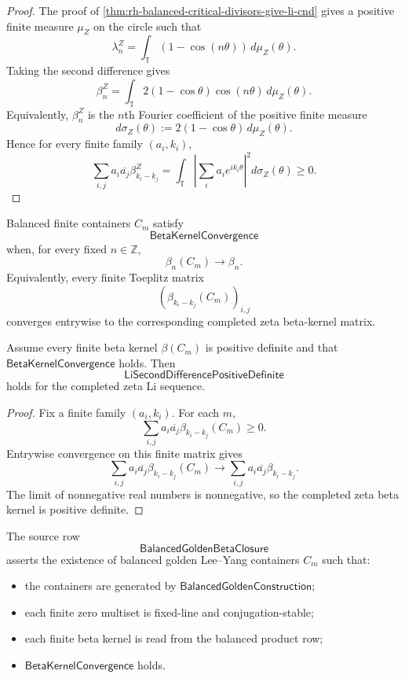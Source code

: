 \begin{proof}
The proof of
\autoref{thm:rh-balanced-critical-divisors-give-li-cnd} gives a
positive finite measure $\mu_Z$ on the circle such that
$$
\lambda_n^Z
=
\int_{\mathbb T}(1-\cos(n\theta))\,d\mu_Z(\theta).
$$
Taking the second difference gives
$$
\beta_n^Z
=
\int_{\mathbb T}
2(1-\cos\theta)\cos(n\theta)\,d\mu_Z(\theta).
$$
Equivalently, $\beta_n^Z$ is the $n$th Fourier coefficient of the
positive finite measure
$$
d\sigma_Z(\theta):=2(1-\cos\theta)\,d\mu_Z(\theta).
$$
Hence for every finite family $(a_i,k_i)$,
$$
\sum_{i,j}a_i\overline{a_j}\beta_{k_i-k_j}^Z
=
\int_{\mathbb T}
\left|
\sum_i a_i e^{ik_i\theta}
\right|^2
d\sigma_Z(\theta)
\ge0.
$$
\end{proof}

\begin{definition}
\label{def:rh-beta-kernel-convergence}
Balanced finite containers $C_m$ satisfy
$$
\mathsf{BetaKernelConvergence}
$$
when, for every fixed $n\in\mathbb Z$,
$$
\beta_n(C_m)\to\beta_n.
$$
Equivalently, every finite Toeplitz matrix
$$
\left(\beta_{k_i-k_j}(C_m)\right)_{i,j}
$$
converges entrywise to the corresponding completed zeta beta-kernel
matrix.
\end{definition}

\begin{theorem}
\label{thm:rh-positive-beta-kernels-closed-under-finite-limits}
Assume every finite beta kernel $\beta(C_m)$ is positive definite and
that $\mathsf{BetaKernelConvergence}$ holds.  Then
$$
\mathsf{LiSecondDifferencePositiveDefinite}
$$
holds for the completed zeta Li sequence.
\end{theorem}

\begin{proof}
Fix a finite family $(a_i,k_i)$.  For each $m$,
$$
\sum_{i,j}a_i\overline{a_j}\beta_{k_i-k_j}(C_m)\ge0.
$$
Entrywise convergence on this finite matrix gives
$$
\sum_{i,j}a_i\overline{a_j}\beta_{k_i-k_j}(C_m)
\longrightarrow
\sum_{i,j}a_i\overline{a_j}\beta_{k_i-k_j}.
$$
The limit of nonnegative real numbers is nonnegative, so the completed
zeta beta kernel is positive definite.
\end{proof}

\begin{definition}
\label{def:rh-balanced-golden-beta-closure}
The source row
$$
\mathsf{BalancedGoldenBetaClosure}
$$
asserts the existence of balanced golden Lee--Yang containers $C_m$ such
that:

\begin{itemize}
\item the containers are generated by
$\mathsf{BalancedGoldenConstruction}$;
\item each finite zero multiset is fixed-line and conjugation-stable;
\item each finite beta kernel is read from the balanced product row;
\item $\mathsf{BetaKernelConvergence}$ holds.
\end{itemize}
\end{definition}

